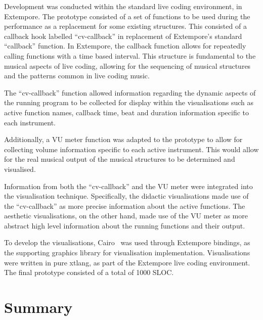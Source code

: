 Development was conducted within the standard live coding environment, in Extempore. The prototype consisted of a set of functions to be used during the performance as a replacement for some existing structures. This consisted of a callback hook labelled ``cv-callback'' in replacement of Extempore's standard ``callback'' function. In Extempore, the callback function allows for repeatedly calling functions with a time based interval. This structure is fundamental to the musical aspects of live coding, allowing for the sequencing of musical structures and the patterns common in live coding music.

The ``cv-callback'' function allowed information regarding the dynamic aspects of the running program to be collected for display within the visualisations such as active function names, callback time, beat and duration information specific to each instrument.

Additionally, a \ac{VU} meter function was adapted to the prototype to allow for collecting volume information specific to each active instrument. This would allow for the real musical output of the musical structures to be determined and visualised.

Information from both the ``cv-callback'' and the \ac{VU} meter were integrated into the visualisation technique. Specifically, the didactic visualisations made use of the ``cv-callback'' as more precise information about the active functions. The aesthetic visualisations, on the other hand, made use of the \ac{VU} meter as more abstract high level information about the running functions and their output.

To develop the visualisations, Cairo~\cite{Worth2012} was used through Extempore bindings, as the supporting graphics library for visualisation implementation. Visualisations were written in pure xtlang, as part of the Extempore live coding environment. The final prototype consisted of a total of 1000 \ac{SLOC}.





\section{Summary}

